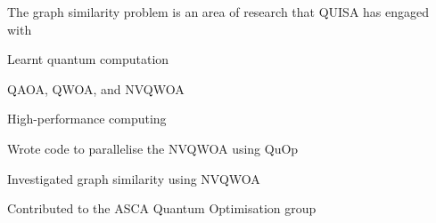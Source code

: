 The graph similarity problem is an area of research that QUISA has engaged with 

Learnt quantum computation

QAOA, QWOA, and NVQWOA

High-performance computing

Wrote code to parallelise the NVQWOA using QuOp

Investigated graph similarity using NVQWOA

Contributed to the ASCA Quantum Optimisation group